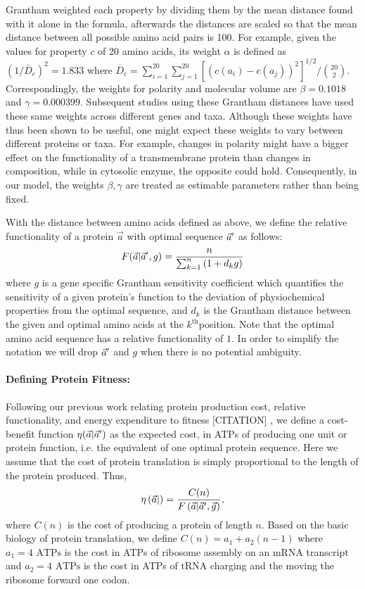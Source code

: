 Grantham weighted each property by dividing them by the mean distance found with it alone in the formula, afterwards the distances are scaled so that the mean distance between all possible amino acid pairs is 100.
For example, given the values for property $c$ of 20 amino acids, its weight $\alpha$ is defined as $(1/\bar{D}_c)^2 = 1.833$ where $\bar{D}_c = \sum_{i=1}^{20}  \sum_{j=1}^{20}[(c\left(a_i\right) - c\left(a_j\right))^2]^{1/2}/\binom{20}{2}$.
Correspondingly, the weights for polarity and molecular volume are $\beta = 0.1018$ and $\gamma = 0.000399$. 
Subsequent studies using these Grantham distances have used these same weights across different genes and taxa. 
Although these weights have thus been shown to be useful, one might expect these weights to vary between different proteins or taxa. 
For example, changes in polarity might have a bigger effect on the functionality of a transmembrane protein than changes in composition, while in cytosolic enzyme, the opposite could hold. 
Consequently, in our model, the weights $\beta, \gamma$ are treated as estimable parameters rather than being fixed. 

With the distance between amino acids defined as above, we define the relative functionality of a protein $\vec{a}$ with optimal sequence $\vec{a}^\prime$ as follows:
\begin{equation}
F(\vec{a}| \vec{a}^\prime,g)  =  \frac{n}{\sum_{k=1}^n{(1+d_kg)}} \label{eq:harmonic}
\end{equation}
where $g$ is a gene specific Grantham sensitivity coefficient which quantifies the sensitivity of a given protein's function to the deviation of physiochemical properties from the optimal sequence, and $d_k$ is the Grantham distance between the given and optimal amino acids at the $k^{\text{th}}$position.
Note that the optimal amino acid sequence has a relative functionality of $1$. 
In order to simplify the notation we will drop $\vec{a}^\prime$ and $g$ when there is no potential ambiguity.


\paragraph*{Defining Protein Fitness:} 
Following our previous work relating protein production cost, relative functionality, and energy expenditure to fitness [CITATION] \cite{Gilchrist2007,ShahGilchrist2011pnas}, we define a cost-benefit function $\eta(\vec{a}|\vec{a}^\prime)$ as the expected cost, in ATPs of producing one unit or protein function, i.e. the equivalent of one optimal protein sequence. 
Here we assume that the cost of protein translation is simply proportional to the length of the protein produced.
Thus,
\begin{equation}
\label{eq:etadef}
\eta\left(\vec{a} |\right) = \frac{C(n)}{F\left(\vec{a} | \vec{a}^\prime,\vec{g}\right)},
\end{equation}
where $C(n)$ is the cost of producing a protein of length $n$.
Based on the basic biology of protein translation, we define $C(n) = a_1 + a_2 (n-1) $ where  $a_1 = 4\text{ ATPs}$ is the cost in ATPs of ribosome assembly on an mRNA transcript and $a_2 = 4 \text{ ATPs}$ is the cost in ATPs of tRNA charging and the moving the ribosome forward one codon.

